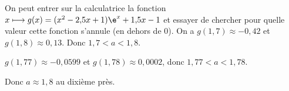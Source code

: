 On peut entrer sur la calculatrice la fonction \( x \longmapsto g(x) = (x^2 - 2{,}5x + 1) \e^x + 1{,}5x - 1 \) et essayer de chercher pour quelle valeur cette fonction s'annule (en dehors de 0). On a \( g(1{,}7) \approx -0{,}42 \) et \( g(1{,}8) \approx 0{,}13 \). Donc \( 1{,}7 < a < 1{,}8 \).

\( g(1{,}77) \approx -0{,}0599 \) et \( g(1{,}78) \approx 0{,}0002 \), donc \( 1{,}77 < a < 1{,}78 \).

Donc \( a \approx 1{,}8 \) au dixième près.
